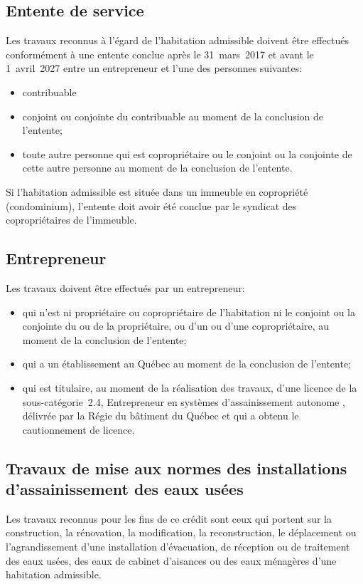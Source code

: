 \subsection{Entente de service}
Les travaux reconnus à l'égard de l'habitation admissible doivent être effectués conformément à une entente conclue après le 31~mars~2017 et avant le 1\ier{}~avril~2027 entre un entrepreneur et l'une des personnes suivantes: 
\begin{itemize}[label=]
	\item contribuable
	\item conjoint ou conjointe du contribuable au moment de la conclusion de l'entente; 
	\item toute autre personne qui est copropriétaire ou le conjoint ou la conjointe de cette autre personne au moment de la conclusion de l'entente. 
\end{itemize}

Si l'habitation admissible est située dans un immeuble en copropriété (condominium), l'entente doit avoir été conclue par le syndicat des copropriétaires de l'immeuble.

\subsection{Entrepreneur}
Les travaux doivent être effectués par un entrepreneur:
\begin{itemize}[label=]
	\item qui n'est ni propriétaire ou copropriétaire de l'habitation ni le conjoint ou la conjointe du ou de la propriétaire, ou d'un ou d'une copropriétaire, au moment de la conclusion de l'entente; 
	\item qui a un établissement au Québec au moment de la conclusion de l'entente; 
	\item qui est titulaire, au moment de la réalisation des travaux, d'une licence de la sous-catégorie~2.4, \og Entrepreneur en systèmes d'assainissement autonome \fg{}, délivrée par la Régie du bâtiment du Québec et qui a obtenu le cautionnement de licence.
\end{itemize}


\subsection{Travaux de mise aux normes des installations d'assainissement des eaux usées}
Les travaux reconnus pour les fins de ce crédit sont ceux qui portent sur la construction, la rénovation, la modification, la reconstruction, le déplacement ou l'agrandissement d'une installation d'évacuation, de réception ou de traitement des eaux usées, des eaux de cabinet d'aisances ou des eaux ménagères d'une habitation admissible.


